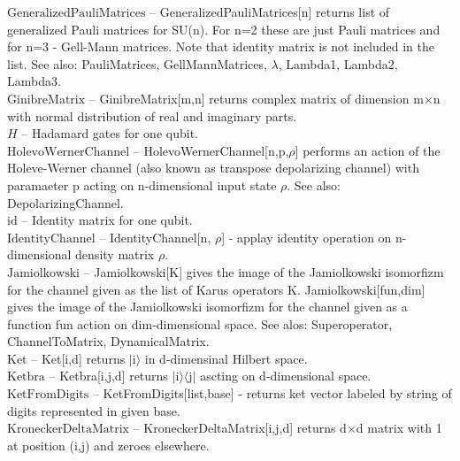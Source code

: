\documentclass[a4paper,11pt]{article}
\begin{document}
\textbf{$ \text{GeneralizedPauliMatrices} $ }-- GeneralizedPauliMatrices[n] returns list of generalized Pauli matrices for SU(n). For n=2 these are just Pauli matrices and for n=3 - Gell-Mann matrices. Note that identity matrix is not included in the list. See also: PauliMatrices, GellMannMatrices, $\lambda $, Lambda1, Lambda2, Lambda3.$  $\\

\textbf{$ \text{GinibreMatrix} $ }-- GinibreMatrix[m,n] returns complex matrix of dimension m$\times $n with normal distribution of real and imaginary parts.$  $\\

\textbf{$ H $ }-- Hadamard gates for one qubit.$  $\\

\textbf{$ \text{HolevoWernerChannel} $ }-- HolevoWernerChannel[n,p,$\rho $] performs an action of the Holeve-Werner channel (also known as transpose depolarizing channel) with paramaeter p acting on n-dimensional input state $\rho $. See also: DepolarizingChannel.$  $\\

\textbf{$ \text{id} $ }-- Identity matrix for one qubit.$  $\\

\textbf{$ \text{IdentityChannel} $ }-- IdentityChannel[n, $\rho $] - applay identity operation on n-dimensional density matrix $\rho $.$  $\\

\textbf{$ \text{Jamiolkowski} $ }-- Jamiolkowski[K] gives the image of the Jamiolkowski isomorfizm for the channel given as the list of Karus operators K. Jamiolkowski[fun,dim] gives the image of the Jamiolkowski isomorfizm for the channel given as a function fun action on dim-dimensional space. See alos: Superoperator, ChannelToMatrix, DynamicalMatrix.$  $\\

\textbf{$ \text{Ket} $ }-- Ket[i,d] returns $|$i$\rangle $ in d-dimensinal Hilbert space.$  $\\

\textbf{$ \text{Ketbra} $ }-- Ketbra[i,j,d] returns $|$i$\rangle \langle $j$|$ ascting on d-dimensional space.$  $\\

\textbf{$ \text{KetFromDigits} $ }-- KetFromDigits[list,base] - returns ket vector labeled by string of digits represented in given base.$  $\\

\textbf{$ \text{KroneckerDeltaMatrix} $ }-- KroneckerDeltaMatrix[i,j,d] returns d$\times $d matrix with 1 at position (i,j) and zeroes elsewhere.$  $\\
\end{document}
